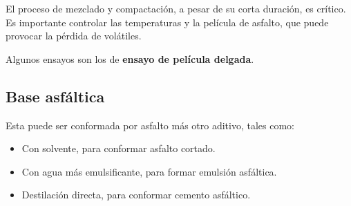 \documentclass[../main.tex]{subfiles}
\begin{document}
El proceso de mezclado y compactación, a pesar de su corta duración, es crítico.
Es importante controlar las temperaturas y la película de asfalto, que puede
provocar la pérdida de volátiles.

Algunos ensayos son los de \textbf{ensayo de película delgada}.

\subsection{Base asfáltica}

Esta puede ser conformada por asfalto más otro aditivo, tales como:

\begin{itemize}
  \item Con solvente, para conformar asfalto cortado.
  \item Con agua más emulsificante, para formar emulsión asfáltica.
  \item Destilación directa, para conformar cemento asfáltico.
\end{itemize}
\end{document}

